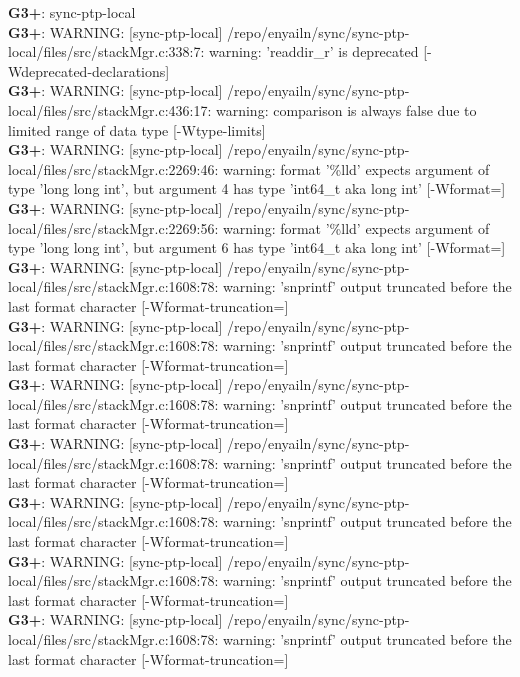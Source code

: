 \documentclass[12pt,twoside]{article}
\begin{document}
\textbf{G3+}: sync-ptp-local\\ 
\textbf{G3+}: WARNING: [sync-ptp-local] /repo/enyailn/sync/sync-ptp-local/files/src/stackMgr.c:338:7: warning: 'readdir\_r' is deprecated [-Wdeprecated-declarations]\\ 
\textbf{G3+}: WARNING: [sync-ptp-local] /repo/enyailn/sync/sync-ptp-local/files/src/stackMgr.c:436:17: warning: comparison is always false due to limited range of data type [-Wtype-limits]\\ 
\textbf{G3+}: WARNING: [sync-ptp-local] /repo/enyailn/sync/sync-ptp-local/files/src/stackMgr.c:2269:46: warning: format '\%lld' expects argument of type 'long long int', but argument 4 has type 'int64\_t {aka long int}' [-Wformat=]\\ 
\textbf{G3+}: WARNING: [sync-ptp-local] /repo/enyailn/sync/sync-ptp-local/files/src/stackMgr.c:2269:56: warning: format '\%lld' expects argument of type 'long long int', but argument 6 has type 'int64\_t {aka long int}' [-Wformat=]\\ 
\textbf{G3+}: WARNING: [sync-ptp-local] /repo/enyailn/sync/sync-ptp-local/files/src/stackMgr.c:1608:78: warning: 'snprintf' output truncated before the last format character [-Wformat-truncation=]\\ 
\textbf{G3+}: WARNING: [sync-ptp-local] /repo/enyailn/sync/sync-ptp-local/files/src/stackMgr.c:1608:78: warning: 'snprintf' output truncated before the last format character [-Wformat-truncation=]\\ 
\textbf{G3+}: WARNING: [sync-ptp-local] /repo/enyailn/sync/sync-ptp-local/files/src/stackMgr.c:1608:78: warning: 'snprintf' output truncated before the last format character [-Wformat-truncation=]\\ 
\textbf{G3+}: WARNING: [sync-ptp-local] /repo/enyailn/sync/sync-ptp-local/files/src/stackMgr.c:1608:78: warning: 'snprintf' output truncated before the last format character [-Wformat-truncation=]\\ 
\textbf{G3+}: WARNING: [sync-ptp-local] /repo/enyailn/sync/sync-ptp-local/files/src/stackMgr.c:1608:78: warning: 'snprintf' output truncated before the last format character [-Wformat-truncation=]\\ 
\textbf{G3+}: WARNING: [sync-ptp-local] /repo/enyailn/sync/sync-ptp-local/files/src/stackMgr.c:1608:78: warning: 'snprintf' output truncated before the last format character [-Wformat-truncation=]\\ 
\textbf{G3+}: WARNING: [sync-ptp-local] /repo/enyailn/sync/sync-ptp-local/files/src/stackMgr.c:1608:78: warning: 'snprintf' output truncated before the last format character [-Wformat-truncation=]\\ 
\end{document}
